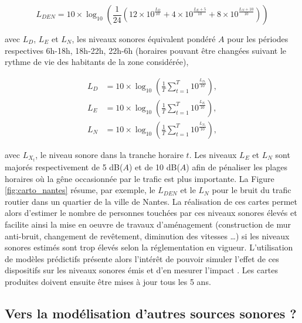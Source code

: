 \begin{equation}
L_{DEN} = 10\times\log_{10} \left(\frac{1}{24} \left(12\times10^{\frac{L_D}{10}}+4\times10^{\frac{L_E+5}{10}}+8\times10^{\frac{L_N+10}{10}} \right)\right)
\end{equation}

avec $L_D$, $L_E$ et $L_N$, les niveaux sonores équivalent pondéré $A$ pour les périodes respectives 6h-18h, 18h-22h, 22h-6h (horaires pouvant être changées suivant le rythme de vie des habitants de la zone considérée),

\begin{subequations}
\begin{align}
L_D &= 10\times\log_{10}\left(\frac{1}{T} \sum_{t = 1}^{T}10^{\frac{L_{D_t}}{10}}\right),\\
L_E &= 10\times\log_{10}\left(\frac{1}{T} \sum_{t = 1}^{T}10^{\frac{L_{E_t}}{10}}\right),\\
L_N &= 10\times\log_{10}\left(\frac{1}{T} \sum_{t = 1}^{T}10^{\frac{L_{N_t}}{10}}\right),
\end{align}
\end{subequations}

avec $L_{X_t}$, le niveau sonore dans la tranche horaire $t$. Les niveaux $L_E$ et $L_N$ sont majorés respectivement de 5 dB($A$) et de 10 dB($A$) afin de pénaliser les plages horaires où la gêne occasionnée par le trafic est plus importante. La Figure \ref{fig:carto_nantes} résume, par exemple, le $L_{DEN}$ et le $L_N$ pour le bruit du trafic routier dans un quartier de la ville de Nantes.
La réalisation de ces cartes permet alors d'estimer le nombre  de personnes touchées par ces niveaux sonores élevés et facilite ainsi la mise en oeuvre de travaux d'aménagement (construction de mur anti-bruit, changement de revêtement, diminution des vitesses \dots) si les niveaux sonores estimés sont trop élevés selon la réglementation en vigueur. L'utilisation de modèles prédictifs présente alors l'intérêt de pouvoir simuler l'effet de ces dispositifs sur les niveaux sonores émis et d'en mesurer l'impact \cite{murphy2011scenario,guedes2011influence}. Les cartes produites doivent ensuite être mises à jour tous les 5 ans.


\subsection{Vers la modélisation d'autres sources sonores ?}


